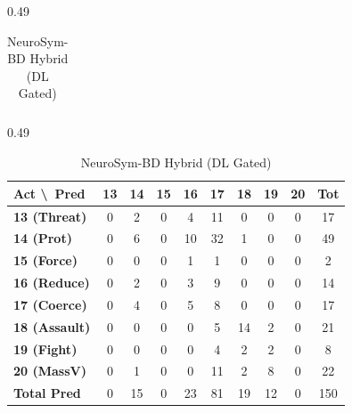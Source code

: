 \documentclass[11pt,a4paper]{article}
\begin{document}
\begin{table}[t]
\begin{subtable}[t]{0.49\textwidth}
\begin{tabular}{lcccccccc|c}
\bottomrule
\end{tabular}
\end{subtable}
\hfill
\begin{subtable}[t]{0.49\textwidth}
\centering
\caption{NeuroSym-BD Hybrid (DL Gated)}
\label{tab:cm_hybrid}
\setlength{\tabcolsep}{3.5pt}
\begin{tabular}{lcccccccc|c}
\toprule
\textbf{Act \textbackslash\ Pred} & \textbf{13} & \textbf{14} & \textbf{15} & \textbf{16} & \textbf{17} & \textbf{18} & \textbf{19} & \textbf{20} & \textbf{Tot} \\
\midrule
\textbf{13 (Threat)}  & 0 & 2  & 0 & 4  & 11 & 0  & 0  & 0 & 17 \\
\textbf{14 (Prot)}    & 0 & 6  & 0 & 10 & 32 & 1  & 0  & 0 & 49 \\
\textbf{15 (Force)}   & 0 & 0  & 0 & 1  & 1  & 0  & 0  & 0 & 2  \\
\textbf{16 (Reduce)}  & 0 & 2  & 0 & 3  & 9  & 0  & 0  & 0 & 14 \\
\textbf{17 (Coerce)}  & 0 & 4  & 0 & 5  & 8  & 0  & 0  & 0 & 17 \\
\textbf{18 (Assault)} & 0 & 0  & 0 & 0  & 5  & 14 & 2  & 0 & 21 \\
\textbf{19 (Fight)}   & 0 & 0  & 0 & 0  & 4  & 2  & 2  & 0 & 8  \\
\textbf{20 (MassV)}   & 0 & 1  & 0 & 0  & 11 & 2  & 8  & 0 & 22 \\
\midrule
\textbf{Total Pred}   & 0 & 15 & 0 & 23 & 81 & 19 & 12 & 0 & 150 \\
\bottomrule
\end{tabular}
\end{subtable}
\end{table}
\end{document}
